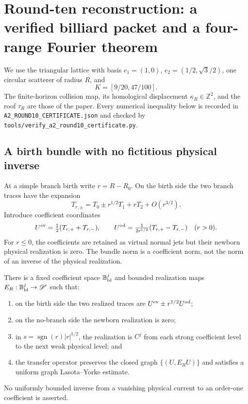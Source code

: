 \section{Round-ten reconstruction: a verified billiard packet and a four-range Fourier theorem}
\label{sec:r10-a2}

We use the triangular lattice with basis
\(e_1=(1,0)\), \(e_2=(1/2,\sqrt3/2)\), one circular scatterer of radius
\(R\), and
\[
 K=[9/20,47/100].
\]
The finite-horizon collision map, its homological displacement
\(\kappa_R\in\mathbb Z^2\), and the roof \(\tau_R\) are those of the paper.
Every numerical inequality below is recorded in
\texttt{A2\_ROUND10\_CERTIFICATE.json} and checked by
\texttt{tools/verify\_a2\_round10\_certificate.py}.

\subsection{A birth bundle with no fictitious physical inverse}

At a simple branch birth write \(r=R-R_0\).  On the birth side the two branch
traces have the expansion
\[
 T_{r,\pm}=T_0\pm r^{1/2}T_1+rT_2+O(r^{3/2}).
\]
Introduce coefficient coordinates
\[
 U^{\rm ev}=\tfrac12(T_{r,+}+T_{r,-}),
 \qquad
 U^{\rm od}=\tfrac1{2r^{1/2}}(T_{r,+}-T_{r,-})
 \quad(r>0).
\]
For \(r\le0\), the coefficients are retained as virtual normal jets but their
newborn physical realization is zero.  The bundle norm is a coefficient norm,
not the norm of an inverse of the physical realization.

\begin{lemma}
\label{lem:r10-a2-birth}
There is a fixed coefficient space \(\mathbb B^{j}_{\rm bl}\) and bounded
realization maps \(E_R:\mathbb B^{j}_{\rm bl}\to\mathscr D'\) such that:
\begin{enumerate}[label=(\roman*)]
\item on the birth side the two realized traces are
      \(U^{\rm ev}\pm r^{1/2}U^{\rm od}\);
\item on the no-branch side the newborn realization is zero;
\item in \(s=\operatorname{sgn}(r)|r|^{1/2}\), the realization is \(C^j\)
      from each strong coefficient level to the next weak physical level; and
\item the transfer operator preserves the closed graph
      \(\{(U,E_RU)\}\) and satisfies a uniform graph Lasota--Yorke estimate.
\end{enumerate}
No uniformly bounded inverse from a vanishing physical current to an
order-one coefficient is asserted.
\end{lemma}

